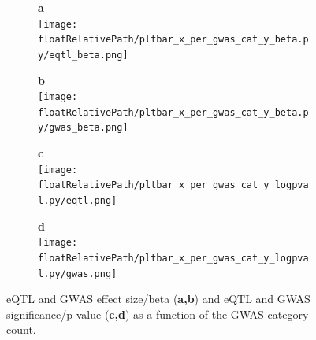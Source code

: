 %
%

\begin{figure}[!tbp]
\centering
%
\begin{subfigure}[]{.33\textwidth}
\textbf{a}
\\
\texttt{[image: \\floatRelativePath/pltbar\_x\_per\_gwas\_cat\_y\_beta.py/eqtl\_beta.png]}
\end{subfigure}
%
\begin{subfigure}[]{.33\textwidth}
\textbf{b}
\\
\texttt{[image: \\floatRelativePath/pltbar\_x\_per\_gwas\_cat\_y\_beta.py/gwas\_beta.png]}
\end{subfigure}

\begin{subfigure}[]{.33\textwidth}
\textbf{c}
\\
\texttt{[image: \\floatRelativePath/pltbar\_x\_per\_gwas\_cat\_y\_logpval.py/eqtl.png]}
\end{subfigure}
%
\begin{subfigure}[]{.33\textwidth}
\textbf{d}
\\
\texttt{[image: \\floatRelativePath/pltbar\_x\_per\_gwas\_cat\_y\_logpval.py/gwas.png]}
\end{subfigure}

\caption{eQTL and GWAS effect size/beta (\textbf{a,b}) and eQTL and GWAS significance/p-value (\textbf{c,d}) as a function of the GWAS category count.} \label{fig:beta_pval}
%
\end{figure}

%
%

